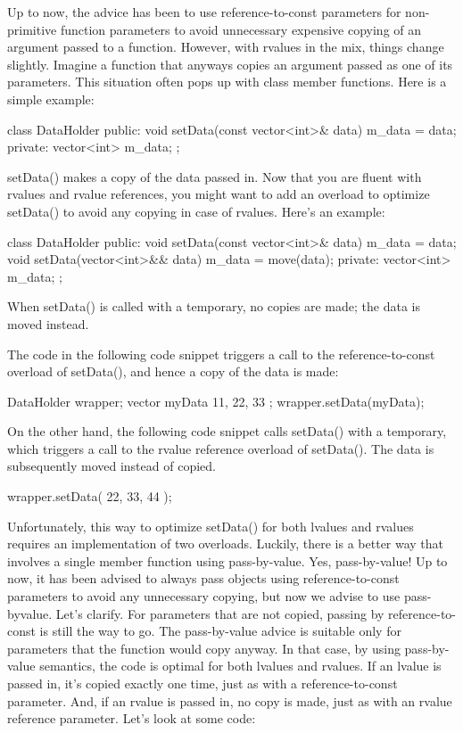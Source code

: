 
Up to now, the advice has been to use reference-to-const parameters for non-primitive function parameters to avoid unnecessary expensive copying of an argument passed to a function. However, with rvalues in the mix, things change slightly. Imagine a function that anyways copies an argument passed as one of its parameters. This situation often pops up with class member functions. Here is a simple example:

\begin{cpp}
class DataHolder
{
    public:
        void setData(const vector<int>& data) { m_data = data; }
    private:
        vector<int> m_data;
};
\end{cpp}

setData() makes a copy of the data passed in. Now that you are fluent with rvalues and rvalue references, you might want to add an overload to optimize setData() to avoid any copying in case of rvalues. Here’s an example:

\begin{cpp}
class DataHolder
{
    public:
        void setData(const vector<int>& data) { m_data = data; }
        void setData(vector<int>&& data) { m_data = move(data); }
    private:
        vector<int> m_data;
};
\end{cpp}

When setData() is called with a temporary, no copies are made; the data is moved instead.

The code in the following code snippet triggers a call to the reference-to-const overload of setData(), and hence a copy of the data is made:

\begin{cpp}
DataHolder wrapper;
vector myData { 11, 22, 33 };
wrapper.setData(myData);
\end{cpp}

On the other hand, the following code snippet calls setData() with a temporary, which triggers a call to the rvalue reference overload of setData(). The data is subsequently moved instead of copied.

\begin{cpp}
wrapper.setData({ 22, 33, 44 });
\end{cpp}

Unfortunately, this way to optimize setData() for both lvalues and rvalues requires an implementation of two overloads. Luckily, there is a better way that involves a single member function using pass-by-value. Yes, pass-by-value! Up to now, it has been advised to always pass objects using reference-to-const parameters to avoid any unnecessary copying, but now we advise to use pass-byvalue. Let’s clarify. For parameters that are not copied, passing by reference-to-const is still the way to go. The pass-by-value advice is suitable only for parameters that the function would copy anyway. In that case, by using pass-by-value semantics, the code is optimal for both lvalues and rvalues. If an lvalue is passed in, it’s copied exactly one time, just as with a reference-to-const parameter. And, if an rvalue is passed in, no copy is made, just as with an rvalue reference parameter. Let’s look at some code:

